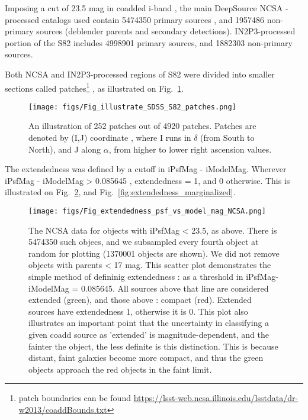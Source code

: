 \documentclass[fleqn,usenatbib]{mnras}  %
\begin{document}
Imposing a cut of 23.5 mag in coadded i-band , the main DeepSource NCSA -processed catalogs used contain 5474350 primary sources , and 1957486 non-primary sources (deblender parents and secondary detections). IN2P3-processed portion of the S82 includes 4998901 primary sources, and 1882303 non-primary sources.   

Both NCSA and IN2P3-processed  regions of S82 were divided into smaller sections called patches\footnote{patch boundaries can be found \url{https://lsst-web.ncsa.illinois.edu/lsstdata/dr-w2013/coaddBounds.txt} }  , as illustrated on Fig.~\ref{fig:patches}.  

\begin{figure}
\texttt{[image: figs/Fig\_illustrate\_SDSS\_S82\_patches.png]}
\caption{An illustration of 252 patches out of 4920 patches. Patches are denoted by (I,J) coordinate , where I runs in $\delta$ (from South to North), and J along $\alpha$, from higher to lower right ascension values.  }
\label{fig:patches}
\end{figure}


The extendedness was defined by a cutoff in iPsfMag - iModelMag. Wherever iPsfMag - iModelMag >  0.085645 , extendedness = 1, and 0 otherwise.  This is illustrated on Fig.~\ref{fig:extendedness}, and Fig.~\ref{fig:extendedness_marginalized}. 

\begin{figure}
\texttt{[image: figs/Fig\_extendedness\_psf\_vs\_model\_mag\_NCSA.png]}
\caption{The NCSA data for objects with iPsfMag < 23.5, as above. There is 5474350 such objecs, and we subsampled every fourth object at random for plotting (1370001 objects are shown). We did not remove objects with parents < 17 mag. This scatter plot demonstrates the simple method of defininig extendedness : as a threshold in iPsfMag-iModelMag = 0.085645. All sources above that line are considered extended (green), and those above : compact (red). Extended sources have extendedness 1, otherwise it is 0.  This plot also illustrates an important point that the uncertainty in classifying a given coadd source  as 'extended' is magnitude-dependent, and the fainter the object, the less definite is this distinction.  This is because distant, faint galaxies become more compact, and thus the green objects approach the red objects in the faint limit. }
\label{fig:extendedness}
\end{figure}
\end{document}

